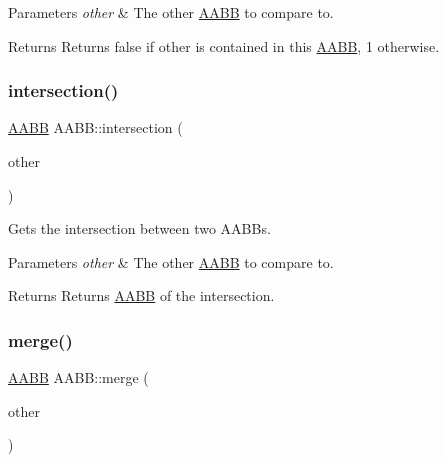 \begin{DoxyParams}{Parameters}
{\em other} & The other \mbox{\hyperlink{class_a_a_b_b}{A\+A\+BB}} to compare to. \\
\hline
\end{DoxyParams}
\begin{DoxyReturn}{Returns}
Returns false if other is contained in this \mbox{\hyperlink{class_a_a_b_b}{A\+A\+BB}}, 1 otherwise. 
\end{DoxyReturn}
\mbox{\label{class_a_a_b_b_a0d4565bf10f3d1aa18cee2bd471f198e}} 
\subsubsection{\texorpdfstring{intersection()}{intersection()}}
{\footnotesize\ttfamily \mbox{\hyperlink{class_a_a_b_b}{A\+A\+BB}} A\+A\+B\+B\+::intersection (\begin{DoxyParamCaption}\item[{\mbox{\hyperlink{class_a_a_b_b}{A\+A\+BB}} \&}]{other }\end{DoxyParamCaption})}



Gets the intersection between two A\+A\+B\+Bs. 


\begin{DoxyParams}{Parameters}
{\em other} & The other \mbox{\hyperlink{class_a_a_b_b}{A\+A\+BB}} to compare to. \\
\hline
\end{DoxyParams}
\begin{DoxyReturn}{Returns}
Returns \mbox{\hyperlink{class_a_a_b_b}{A\+A\+BB}} of the intersection. 
\end{DoxyReturn}
\mbox{\label{class_a_a_b_b_a19109a399dbd65308a7c4dfd1c4728be}} 
\subsubsection{\texorpdfstring{merge()}{merge()}}
{\footnotesize\ttfamily \mbox{\hyperlink{class_a_a_b_b}{A\+A\+BB}} A\+A\+B\+B\+::merge (\begin{DoxyParamCaption}\item[{\mbox{\hyperlink{class_a_a_b_b}{A\+A\+BB}} \&}]{other }\end{DoxyParamCaption})}



